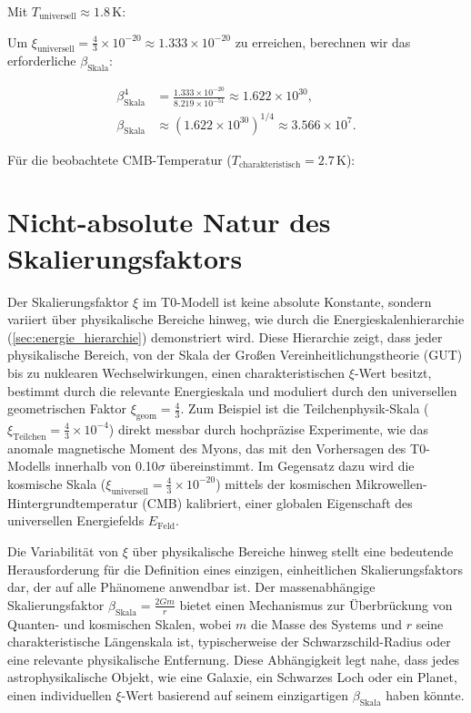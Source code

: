 \documentclass[12pt,a4paper]{report}
\newcommand{\Efield}{E_{\text{Feld}}}
\newcommand{\xipar}{\xi}
\newcommand{\xiparticle}{\xi_{\text{Teilchen}}}
\newcommand{\xiuniversal}{\xi_{\text{universell}}}
\newcommand{\xigeom}{\xi_{\text{geom}}}
\newcommand{\Tuniversal}{T_{\text{universell}}}
\newcommand{\Tchar}{T_{\text{charakteristisch}}}
\newcommand{\betascale}{\beta_{\text{Skala}}}
\theoremstyle{definition}
\begin{document}
	Mit $\Tuniversal \approx 1.8 \, \text{K}$:
	
	Um $\xiuniversal = \frac{4}{3} \times 10^{-20} \approx 1.333 \times 10^{-20}$ zu erreichen, berechnen wir das erforderliche $\betascale$:
	
	\begin{align}
		\betascale^4 &= \frac{1.333 \times 10^{-20}}{8.219 \times 10^{-51}} \approx 1.622 \times 10^{30}, \\
		\betascale &\approx (1.622 \times 10^{30})^{1/4} \approx 3.566 \times 10^7.
	\end{align}
	
	Für die beobachtete CMB-Temperatur ($\Tchar = 2.7 \, \text{K}$):
	
	\section{Nicht-absolute Natur des Skalierungsfaktors}
	\label{sec:nicht_absolute_skalierung}
	
	Der Skalierungsfaktor $\xipar$ im T0-Modell ist keine absolute Konstante, sondern variiert über physikalische Bereiche hinweg, wie durch die Energieskalenhierarchie (\cref{sec:energie_hierarchie}) demonstriert wird. Diese Hierarchie zeigt, dass jeder physikalische Bereich, von der Skala der Großen Vereinheitlichungstheorie (GUT) bis zu nuklearen Wechselwirkungen, einen charakteristischen $\xipar$-Wert besitzt, bestimmt durch die relevante Energieskala und moduliert durch den universellen geometrischen Faktor $\xigeom = \frac{4}{3}$. Zum Beispiel ist die Teilchenphysik-Skala ($\xiparticle = \frac{4}{3} \times 10^{-4}$) direkt messbar durch hochpräzise Experimente, wie das anomale magnetische Moment des Myons, das mit den Vorhersagen des T0-Modells innerhalb von 0.10$\sigma$ übereinstimmt. Im Gegensatz dazu wird die kosmische Skala ($\xiuniversal = \frac{4}{3} \times 10^{-20}$) mittels der kosmischen Mikrowellen-Hintergrundtemperatur (CMB) kalibriert, einer globalen Eigenschaft des universellen Energiefelds $\Efield$.
	
	Die Variabilität von $\xipar$ über physikalische Bereiche hinweg stellt eine bedeutende Herausforderung für die Definition eines einzigen, einheitlichen Skalierungsfaktors dar, der auf alle Phänomene anwendbar ist. Der massenabhängige Skalierungsfaktor $\betascale = \frac{2Gm}{r}$ bietet einen Mechanismus zur Überbrückung von Quanten- und kosmischen Skalen, wobei $m$ die Masse des Systems und $r$ seine charakteristische Längenskala ist, typischerweise der Schwarzschild-Radius oder eine relevante physikalische Entfernung. Diese Abhängigkeit legt nahe, dass jedes astrophysikalische Objekt, wie eine Galaxie, ein Schwarzes Loch oder ein Planet, einen individuellen $\xipar$-Wert basierend auf seinem einzigartigen $\betascale$ haben könnte.
	
\end{document}

